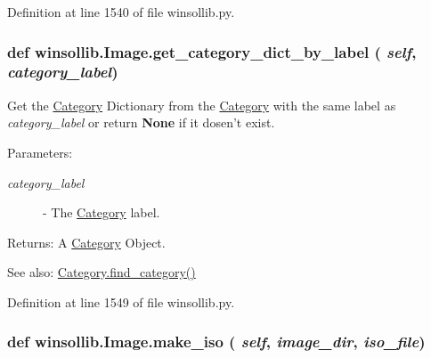 Definition at line 1540 of file winsollib.py.\hypertarget{classwinsollib_1_1Image_2d0838bb9795f27dee544e36f63c2d4c}{
\subsubsection[get\_\-category\_\-dict\_\-by\_\-label]{\setlength{\rightskip}{0pt plus 5cm}def winsollib.Image.get\_\-category\_\-dict\_\-by\_\-label ( {\em self},  {\em category\_\-label})}}
\label{classwinsollib_1_1Image_2d0838bb9795f27dee544e36f63c2d4c}


Get the \hyperlink{classwinsollib_1_1Category}{Category} Dictionary from the \hyperlink{classwinsollib_1_1Category}{Category} with the same label as {\em category\_\-label\/} or return {\bf None} if it dosen't exist. 

\begin{Desc}
\item[Parameters:]
\begin{description}
\item[{\em category\_\-label}]- The \hyperlink{classwinsollib_1_1Category}{Category} label. \end{description}
\end{Desc}
\begin{Desc}
\item[Returns:]A \hyperlink{classwinsollib_1_1Category}{Category} Object.\end{Desc}
\begin{Desc}
\item[See also:]\hyperlink{classwinsollib_1_1Category_ced2fd769fd79d564f6b5fc588797d2d}{Category.find\_\-category()} \end{Desc}


Definition at line 1549 of file winsollib.py.\hypertarget{classwinsollib_1_1Image_28f8bc77b1f1637445b41b14d448134f}{
\subsubsection[make\_\-iso]{\setlength{\rightskip}{0pt plus 5cm}def winsollib.Image.make\_\-iso ( {\em self},  {\em image\_\-dir},  {\em iso\_\-file})}}
\label{classwinsollib_1_1Image_28f8bc77b1f1637445b41b14d448134f}


